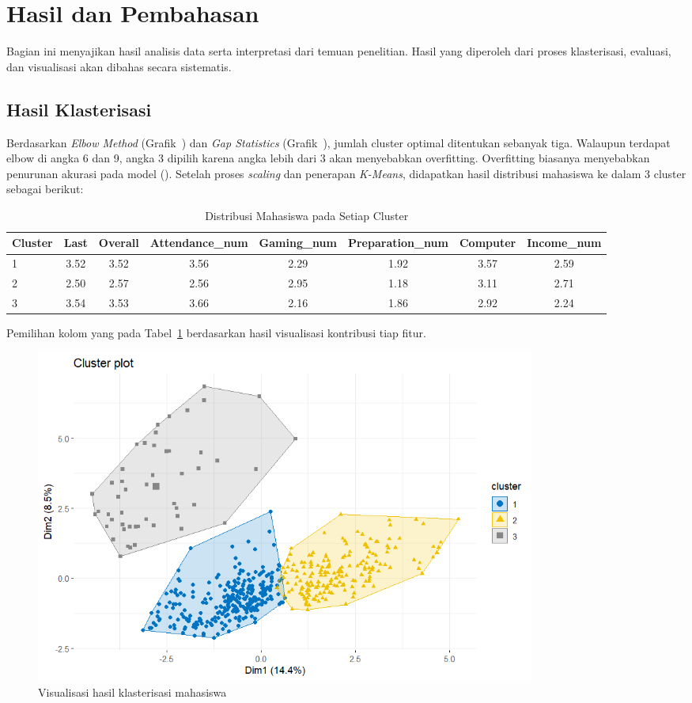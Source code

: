 \section{Hasil dan Pembahasan}
Bagian ini menyajikan hasil analisis data serta interpretasi dari temuan penelitian. Hasil yang diperoleh dari proses klasterisasi, evaluasi, dan visualisasi akan dibahas secara sistematis.

\subsection{Hasil Klasterisasi}
Berdasarkan \textit{Elbow Method} (Grafik~) dan \textit{Gap Statistics} (Grafik~), jumlah cluster optimal ditentukan sebanyak tiga. Walaupun terdapat elbow di angka 6 dan 9, angka 3 dipilih karena angka lebih dari 3 akan menyebabkan overfitting. Overfitting biasanya menyebabkan penurunan akurasi pada model (\cite{Webb2011}). Setelah proses \textit{scaling} dan penerapan \textit{K-Means}, didapatkan hasil distribusi mahasiswa ke dalam 3 cluster sebagai berikut:
\begin{table}[!htpb]
    \centering
    \caption{Distribusi Mahasiswa pada Setiap Cluster}
    \label{tab:cluster-distribusi}
    \begin{tabular}{lccccccc}
        \hline
        \textbf{Cluster} & \textbf{Last} & \textbf{Overall} & \textbf{Attendance\_num} & \textbf{Gaming\_num} & \textbf{Preparation\_num} & \textbf{Computer} & \textbf{Income\_num} \\
        \hline
        1 & 3.52 & 3.52 & 3.56 & 2.29 & 1.92 & 3.57 & 2.59 \\
        2 & 2.50 & 2.57 & 2.56 & 2.95 & 1.18 & 3.11 & 2.71 \\
        3 & 3.54 & 3.53 & 3.66 & 2.16 & 1.86 & 2.92 & 2.24 \\
        \hline
    \end{tabular}
\end{table}

Pemilihan kolom yang pada Tabel~\ref{tab:cluster-distribusi} berdasarkan hasil visualisasi kontribusi tiap fitur.
\pagebreak

\begin{figure}[!htpb]
    \centering
    \includegraphics[width=0.8\textwidth]{figures/clusterplot.png}
    \caption{Visualisasi hasil klasterisasi mahasiswa}
    \label{fig:cluster-visualization-png}
\end{figure}


